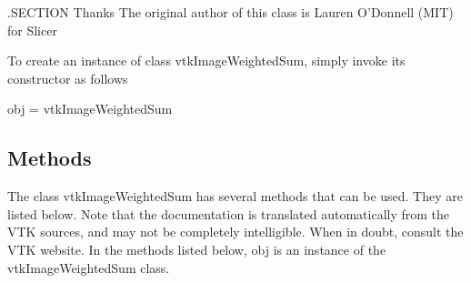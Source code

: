 .S\-E\-C\-T\-I\-O\-N Thanks The original author of this class is Lauren O'Donnell (M\-I\-T) for Slicer

To create an instance of class vtk\-Image\-Weighted\-Sum, simply invoke its constructor as follows \begin{DoxyVerb}  obj = vtkImageWeightedSum
\end{DoxyVerb}
 \hypertarget{vtkwidgets_vtkxyplotwidget_Methods}{}\subsection{Methods}\label{vtkwidgets_vtkxyplotwidget_Methods}
The class vtk\-Image\-Weighted\-Sum has several methods that can be used. They are listed below. Note that the documentation is translated automatically from the V\-T\-K sources, and may not be completely intelligible. When in doubt, consult the V\-T\-K website. In the methods listed below, {\ttfamily obj} is an instance of the vtk\-Image\-Weighted\-Sum class. 
